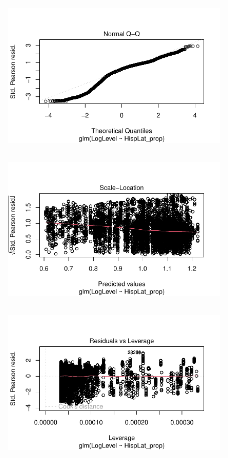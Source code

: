 \documentclass[
  letterpaper,
  DIV=11,
  numbers=noendperiod]{scrartcl}
\begin{document}
\begin{figure}[H]

{\centering \includegraphics[width=0.5\textwidth,height=\textheight]{appendix_files/figure-pdf/unnamed-chunk-6-6.pdf}

}

\end{figure}

\begin{figure}[H]

{\centering \includegraphics[width=0.5\textwidth,height=\textheight]{appendix_files/figure-pdf/unnamed-chunk-6-7.pdf}

}

\end{figure}

\begin{figure}[H]

{\centering \includegraphics[width=0.5\textwidth,height=\textheight]{appendix_files/figure-pdf/unnamed-chunk-6-8.pdf}

}

\end{figure}
\end{document}
